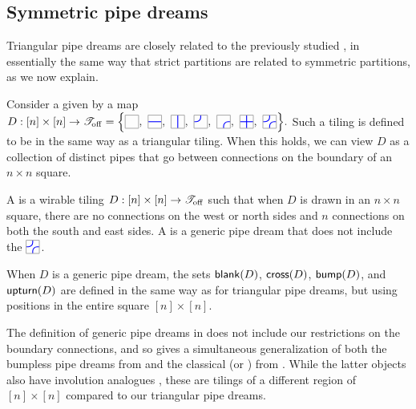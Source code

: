 \documentclass[10pt]{article}
\begin{document}
\subsection{Symmetric pipe dreams}\label{sym-pd-sect}

Triangular pipe dreams are closely related to the  previously studied \cite{KZJ,LLS,Weigandt},
 in essentially the same way that strict partitions are related to symmetric partitions,
 as we now explain.
 
Consider a  given by a map
$
D : [n]\times [n] \to \cToff=
\Bigl\{
\BTILE,\
\HTILE,\
\VTILE,\
\JTILE, \
\CTILE,\ 
\PTILE,\
\ETILE
\Bigr\}.
$
Such a tiling is defined to be  in the same way as a triangular tiling. When this holds, we can view $D$ as a collection of distinct pipes that go between connections on the boundary of an $n\times n$ square.

\begin{definition}
A  is a wirable tiling $D : [n]\times [n] \to \mathscr{T}_{\mathrm{off}}$ 
such that when $D$ is drawn in 
an $n\times n$ square, 
there are no connections on the west or north sides and
  $n$ connections on both the south and east sides.
  A  is a generic pipe dream that does not include the  $\ETILE$.
 \end{definition} 
 
 When $D$ is a generic pipe dream, the sets $\mathsf{blank}(D)$, $\mathsf{cross}(D)$, $\mathsf{bump}(D)$, and $\mathsf{upturn}(D)$ are defined in the same way as for triangular pipe dreams, but using positions in the entire square $[n]\times[n]$. 
 
  \begin{remark}
 The definition of generic pipe dreams in \cite{KZJ}
 does not include our restrictions on the boundary connections,
 and so gives a simultaneous generalization of both
  the bumpless pipe dreams from \cite{LLS,Weigandt} and the classical \defn{pipe dreams} (or \defn{rc-graphs}) from \cite{BergeronBilley,KnutsonMiller}.
While the latter objects also have involution analogues \cite{HMP6},  these are tilings of a different region of $[n]\times [n]$ compared to our triangular pipe dreams.
  \end{remark}
\end{document}
